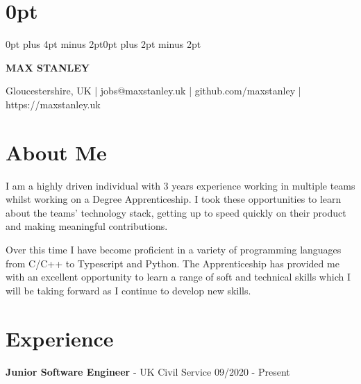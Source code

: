 \documentclass{article}
\begin{document}
\setlength\parindent{0pt}
\setlength{\parskip}{.8em} 
\titlespacing\section{0pt}{0pt plus 4pt minus 2pt}{0pt plus 2pt minus 2pt}

\begin{center}
\begin{huge}
\textbf{MAX STANLEY}
\end{huge}

Gloucestershire, UK
|
jobs@maxstanley.uk
|
github.com/maxstanley
|
https://maxstanley.uk

\end{center}

\section*{About Me}

I am a highly driven individual with 3 years experience working in multiple teams whilst working on a Degree Apprenticeship.
I took these opportunities to learn about the teams' technology stack, getting up to speed quickly on their product and making meaningful contributions.

Over this time I have become proficient in a variety of programming languages from C/C++ to Typescript and Python.
The Apprenticeship has provided me with an excellent opportunity to learn a range of soft and technical skills which I will be taking forward as I continue to develop new skills.

\section*{Experience}

\textbf{Junior Software Engineer} - UK Civil Service \hfill 09/2020 - Present
\end{document}
